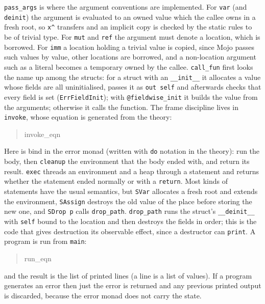 \documentclass[11pt,a4paper]{article}
\newcommand{\usesnip}[1]{\csname #1\endcsname}
\newenvironment{snippet}{\begin{quote}\small}{\end{quote}}
\newcommand{\code}[1]{\texttt{#1}}
\begin{document}
\code{pass\_args} is where the argument conventions are implemented. For
\code{var} (and \code{deinit}) the argument is evaluated to an owned value which
the callee owns in a fresh root, so \code{x\^{}} transfers and an implicit copy
is checked by the static rules to be of trivial type. For \code{mut} and
\code{ref} the argument must denote a location, which is borrowed. For
\code{imm} a location holding a trivial value is copied, since Mojo passes such
values by value, other locations are borrowed, and a non-location argument such
as a literal becomes a temporary owned by the callee. \code{call\_fun} first
looks the name up among the structs: for a struct with an \code{\_\_init\_\_} it
allocates a value whose fields are all uninitialised, passes it as \code{out self}
and afterwards checks that every field is set (\code{ErrFieldInit}); with
\code{@fieldwise\_init} it builds the value from the arguments; otherwise it
calls the function. The frame discipline lives in \code{invoke}, whose equation
is generated from the theory:
\begin{snippet}
\begin{isabelle}
\usesnip{invoke_eqn}
\end{isabelle}
\end{snippet}
Here  is bind in the error monad (written with \code{do}
notation in the theory): run the body, then \code{cleanup} the environment that
the body ended with, and return its result. \code{exec} threads an environment
and a heap through a statement and returns whether the statement ended normally
or with a \code{return}.  Most kinds of statements have the usual semantics,
but \code{SVar} allocates a fresh root and extends the
environment, \code{SAssign} destroys the old value of the place before storing
the new one, and \code{SDrop p} calls \code{drop\_path}. \code{drop\_path} runs the
struct's \code{\_\_deinit\_\_} with \code{self} bound to the location and then
destroys the fields in order; this is the code that gives destruction its
observable effect, since a destructor can \code{print}. A program is run from
\code{main}:
\begin{snippet}
\begin{isabelle}
\usesnip{run_eqn}
\end{isabelle}
\end{snippet}
and the result is the list of printed lines (a line is a list of values). If a
program generates an error then just the error is returned and any previous
printed output is discarded, because the error monad does not carry the state.
\end{document}
